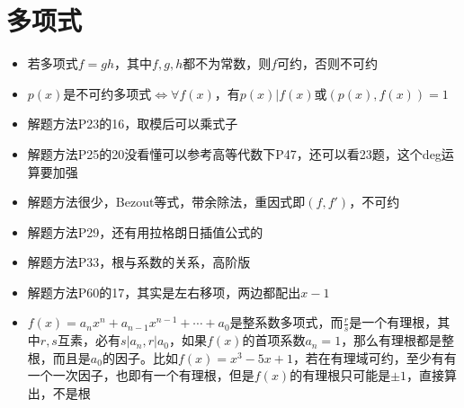\documentclass[UTF8]{ctexart}
\begin{document}
\section{多项式}
\begin{itemize}
\item 若多项式$f=gh$，其中$f,g,h$都不为常数，则$f$可约，否则不可约

\item $p(x)$是不可约多项式$\Leftrightarrow \forall f(x)$，有$p(x)|f(x)$或$(p(x),f(x))=1$

\item 解题方法P23的16，取模后可以乘式子

\item 解题方法P25的20没看懂可以参考高等代数下P47，还可以看23题，这个deg运算要加强

\item 解题方法很少，Bezout等式，带余除法，重因式即$(f,f')，不可约$

\item 解题方法P29，还有用拉格朗日插值公式的

\item 解题方法P33，根与系数的关系，高阶版

\item 解题方法P60的17，其实是左右移项，两边都配出$x-1$

\item $f(x)=a_nx^n+a_{n-1}x^{n-1}+\cdots+a_0$是整系数多项式，而$\frac{r}{s}$是一个有理根，其中$r,s$互素，必有$s|a_n,r|a_0$，如果$f(x)$的首项系数$a_n=1$，那么有理根都是整根，而且是$a_0$的因子。比如$f(x)=x^3-5x+1$，若在有理域可约，至少有有一个一次因子，也即有一个有理根，但是$f(x)$的有理根只可能是$\pm 1$，直接算出，不是根
\end{itemize}
\end{document}

